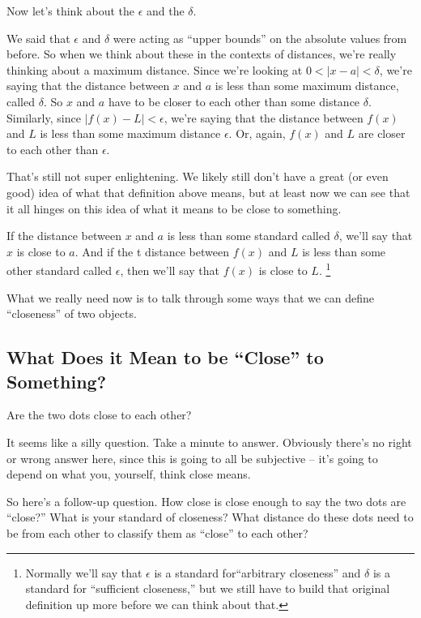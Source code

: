 Now let's think about the $\epsilon$ and the $\delta$.

We said that $\epsilon$ and $\delta$ were acting as ``upper bounds'' on the absolute values from before. So when we think about these in the contexts of distances, we're really thinking about a maximum distance. Since we're looking at $0<|x-a|<\delta$, we're saying that the distance between $x$ and $a$ is less than some maximum distance, called $\delta$. So $x$ and $a$ have to be closer to each other than some distance $\delta$. Similarly, since $|f(x)-L|<\epsilon$, we're saying that the distance between $f(x)$ and $L$ is less than some maximum distance $\epsilon$. Or, again, $f(x)$ and $L$ are closer to each other than $\epsilon$.

That's still not super enlightening. We likely still don't have a great (or even good) idea of what that definition above means, but at least now we can see that it all hinges on this idea of what it means to be close to something.

If the distance between $x$ and $a$ is less than some standard called $\delta$, we'll say that $x$ is close to $a$. And if the t distance between $f(x)$ and $L$ is less than some other standard called $\epsilon$, then we'll say that $f(x)$ is close to $L$.
\footnote{
  Normally we'll say that $\epsilon$ is a standard for``arbitrary closeness'' and $\delta$ is a standard for ``sufficient closeness,'' but we still have to build that original definition up more before we can think about that.
}

What we really need now is to talk through some ways that we can define ``closeness'' of two objects.

\subsection*{What Does it Mean to be ``Close'' to Something?}


Are the two dots close to each other?

It seems like a silly question. Take a minute to answer. Obviously there's no right or wrong answer here, since this is going to all be subjective -- it's going to depend on what you, yourself, think close means.

So here's a follow-up question. How close is close enough to say the two dots are ``close?'' What is your standard of closeness? What distance do these dots need to be from each other to classify them as ``close'' to each other?


